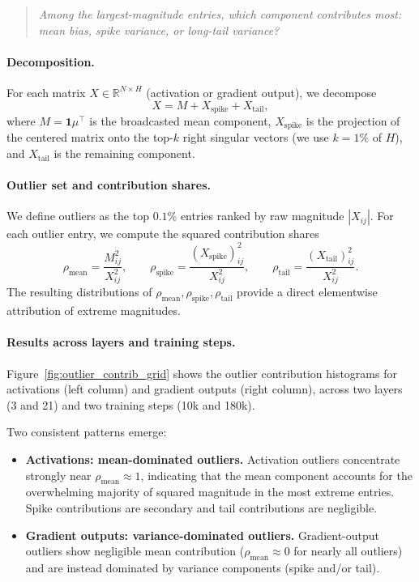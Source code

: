 \begin{quote}
\emph{Among the largest-magnitude entries, which component contributes most:
mean bias, spike variance, or long-tail variance?}
\end{quote}

\paragraph{Decomposition.}
For each matrix $X \in \mathbb{R}^{N\times H}$ (activation or gradient output),
we decompose
\[
X = M + X_{\text{spike}} + X_{\text{tail}},
\]
where $M=\mathbf{1}\mu^\top$ is the broadcasted mean component,
$X_{\text{spike}}$ is the projection of the centered matrix onto the top-$k$
right singular vectors (we use $k=1\%$ of $H$),
and $X_{\text{tail}}$ is the remaining component.

\paragraph{Outlier set and contribution shares.}
We define outliers as the top $0.1\%$ entries ranked by raw magnitude $|X_{ij}|$.
For each outlier entry, we compute the squared contribution shares
\[
\rho_{\text{mean}} = \frac{M_{ij}^2}{X_{ij}^2},\qquad
\rho_{\text{spike}} = \frac{(X_{\text{spike}})_{ij}^2}{X_{ij}^2},\qquad
\rho_{\text{tail}} = \frac{(X_{\text{tail}})_{ij}^2}{X_{ij}^2}.
\]
The resulting distributions of $\rho_{\text{mean}},\rho_{\text{spike}},\rho_{\text{tail}}$
provide a direct elementwise attribution of extreme magnitudes.

\paragraph{Results across layers and training steps.}
Figure~\ref{fig:outlier_contrib_grid} shows the outlier contribution histograms
for activations (left column) and gradient outputs (right column),
across two layers (3 and 21) and two training steps (10k and 180k).

Two consistent patterns emerge:
\begin{itemize}
    \item \textbf{Activations: mean-dominated outliers.}
    Activation outliers concentrate strongly near $\rho_{\text{mean}}\approx 1$,
    indicating that the mean component accounts for the overwhelming majority of
    squared magnitude in the most extreme entries.
    Spike contributions are secondary and tail contributions are negligible.
    \item \textbf{Gradient outputs: variance-dominated outliers.}
    Gradient-output outliers show negligible mean contribution
    ($\rho_{\text{mean}}\approx 0$ for nearly all outliers) and are instead
    dominated by variance components (spike and/or tail).
\end{itemize}

